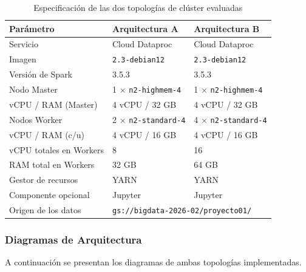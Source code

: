 \begin{table}[H]
\centering
\caption{Especificación de las dos topologías de clúster evaluadas}
\label{tab:clusteres}
\vspace{0.2cm}
\small
\begin{tabular}{@{}lll@{}}
\toprule
\textbf{Parámetro} & \textbf{Arquitectura A} & \textbf{Arquitectura B} \\
\midrule
Servicio                  & Cloud Dataproc          & Cloud Dataproc \\
Imagen                    & \texttt{2.3-debian12}   & \texttt{2.3-debian12} \\
Versión de Spark          & 3.5.3                   & 3.5.3 \\
Nodo Master               & 1 $\times$ \texttt{n2-highmem-4} & 1 $\times$ \texttt{n2-highmem-4} \\
\quad vCPU / RAM (Master) & 4 vCPU / 32 GB          & 4 vCPU / 32 GB \\
Nodos Worker              & 2 $\times$ \texttt{n2-standard-4} & 4 $\times$ \texttt{n2-standard-4} \\
\quad vCPU / RAM (c/u)    & 4 vCPU / 16 GB          & 4 vCPU / 16 GB \\
vCPU totales en Workers   & 8                       & 16 \\
RAM total en Workers      & 32 GB                   & 64 GB \\
Gestor de recursos        & YARN                    & YARN \\
Componente opcional       & Jupyter                 & Jupyter \\
Origen de los datos       & \multicolumn{2}{l}{\texttt{gs:/\bk{}/\bk{}bigdata-\bk{}2026-\bk{}02/\bk{}proyecto01/\bk{}}} \\
\bottomrule
\end{tabular}
\end{table}

\subsubsection{Diagramas de Arquitectura}
A continuación se presentan los diagramas de ambas topologías implementadas.

